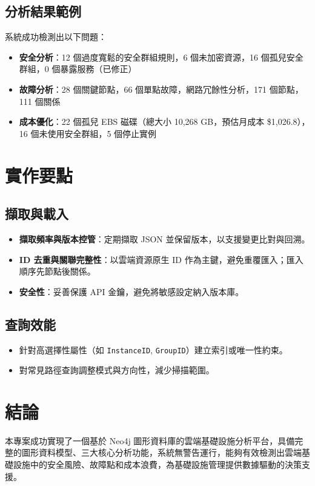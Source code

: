 \documentclass[11pt,a4paper]{ctexart}
\begin{document}
\subsection{分析結果範例}
系統成功檢測出以下問題：
\begin{itemize}[leftmargin=1.5em]
    \item \textbf{安全分析}：12 個過度寬鬆的安全群組規則，6 個未加密資源，16 個孤兒安全群組，0 個暴露服務（已修正）
    \item \textbf{故障分析}：28 個關鍵節點，66 個單點故障，網路冗餘性分析，171 個節點，111 個關係
    \item \textbf{成本優化}：22 個孤兒 EBS 磁碟（總大小 10,268 GB，預估月成本 \$1,026.8），16 個未使用安全群組，5 個停止實例
\end{itemize}

\section{實作要點}
\subsection{擷取與載入}
\begin{itemize}[leftmargin=1.5em]
    \item \textbf{擷取頻率與版本控管}：定期擷取 JSON 並保留版本，以支援變更比對與回溯。
    \item \textbf{ID 去重與關聯完整性}：以雲端資源原生 ID 作為主鍵，避免重覆匯入；匯入順序先節點後關係。
    \item \textbf{安全性}：妥善保護 API 金鑰，避免將敏感設定納入版本庫。
\end{itemize}

\subsection{查詢效能}
\begin{itemize}[leftmargin=1.5em]
    \item 針對高選擇性屬性（如 \texttt{InstanceID}, \texttt{GroupID}）建立索引或唯一性約束。
    \item 對常見路徑查詢調整模式與方向性，減少掃描範圍。
\end{itemize}

\section{結論}
本專案成功實現了一個基於 Neo4j 圖形資料庫的雲端基礎設施分析平台，具備完整的圖形資料模型、三大核心分析功能，系統無警告運行，能夠有效檢測出雲端基礎設施中的安全風險、故障點和成本浪費，為基礎設施管理提供數據驅動的決策支援。
\end{document}
